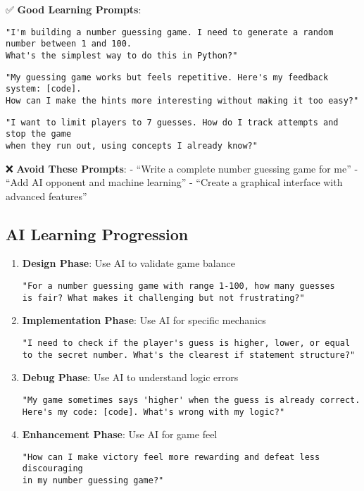 \documentclass[
  letterpaper,
  DIV=11,
  numbers=noendperiod,
  oneside]{scrreprt}
\begin{document}
✅ \textbf{Good Learning Prompts}:

\begin{verbatim}
"I'm building a number guessing game. I need to generate a random number between 1 and 100. 
What's the simplest way to do this in Python?"
\end{verbatim}

\begin{verbatim}
"My guessing game works but feels repetitive. Here's my feedback system: [code].
How can I make the hints more interesting without making it too easy?"
\end{verbatim}

\begin{verbatim}
"I want to limit players to 7 guesses. How do I track attempts and stop the game 
when they run out, using concepts I already know?"
\end{verbatim}

❌ \textbf{Avoid These Prompts}: - ``Write a complete number guessing
game for me'' - ``Add AI opponent and machine learning'' - ``Create a
graphical interface with advanced features''

\subsection{AI Learning Progression}\label{ai-learning-progression-2}

\begin{enumerate}
\def\labelenumi{\arabic{enumi}.}
\item
  \textbf{Design Phase}: Use AI to validate game balance

\begin{verbatim}
"For a number guessing game with range 1-100, how many guesses 
is fair? What makes it challenging but not frustrating?"
\end{verbatim}
\item
  \textbf{Implementation Phase}: Use AI for specific mechanics

\begin{verbatim}
"I need to check if the player's guess is higher, lower, or equal 
to the secret number. What's the clearest if statement structure?"
\end{verbatim}
\item
  \textbf{Debug Phase}: Use AI to understand logic errors

\begin{verbatim}
"My game sometimes says 'higher' when the guess is already correct. 
Here's my code: [code]. What's wrong with my logic?"
\end{verbatim}
\item
  \textbf{Enhancement Phase}: Use AI for game feel

\begin{verbatim}
"How can I make victory feel more rewarding and defeat less discouraging 
in my number guessing game?"
\end{verbatim}
\end{enumerate}
\end{document}
